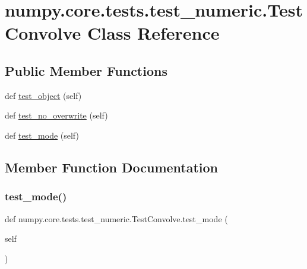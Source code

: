 \hypertarget{classnumpy_1_1core_1_1tests_1_1test__numeric_1_1TestConvolve}{}\section{numpy.\+core.\+tests.\+test\+\_\+numeric.\+Test\+Convolve Class Reference}
\label{classnumpy_1_1core_1_1tests_1_1test__numeric_1_1TestConvolve}
\subsection*{Public Member Functions}
\begin{DoxyCompactItemize}
\item 
def \hyperlink{classnumpy_1_1core_1_1tests_1_1test__numeric_1_1TestConvolve_abb60b5ca93d6d1958325d72e2c03581b}{test\+\_\+object} (self)
\item 
def \hyperlink{classnumpy_1_1core_1_1tests_1_1test__numeric_1_1TestConvolve_abc15613f2186e45caf5a2bbc9bb29fbb}{test\+\_\+no\+\_\+overwrite} (self)
\item 
def \hyperlink{classnumpy_1_1core_1_1tests_1_1test__numeric_1_1TestConvolve_acb7273c78e71112dc92f723b7ad66c93}{test\+\_\+mode} (self)
\end{DoxyCompactItemize}


\subsection{Member Function Documentation}
\mbox{\label{classnumpy_1_1core_1_1tests_1_1test__numeric_1_1TestConvolve_acb7273c78e71112dc92f723b7ad66c93}} 
\subsubsection{\texorpdfstring{test\+\_\+mode()}{test\_mode()}}
{\footnotesize\ttfamily def numpy.\+core.\+tests.\+test\+\_\+numeric.\+Test\+Convolve.\+test\+\_\+mode (\begin{DoxyParamCaption}\item[{}]{self }\end{DoxyParamCaption})}

